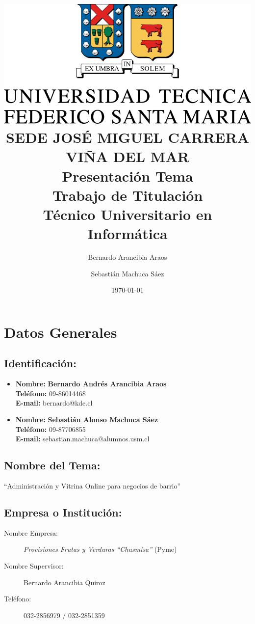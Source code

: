 \documentclass[a4paper,12pt]{article}
\title{\vspace*{4cm} \includegraphics[height=0.1\textheight]{utfsm.png}\\ \vspace*{0.2cm}
\tiny{SEDE JOSÉ MIGUEL CARRERA \\ VIÑA DEL MAR} \vspace*{2cm} \\ 
\Huge {Presentación Tema \\ Trabajo de Titulación} \\ \vspace*{0.5cm}
	 \Large{Técnico Universitario en Informática}}
\author{Bernardo Arancibia Araos
\and Sebastián Machuca Sáez}
\date{\today}
\begin{document}
\maketitle
\thispagestyle{empty} %
\newpage

\tableofcontents
\newpage

\section{Datos Generales}
\subsection{Identificación:}

  \begin{itemize}
   \item \textbf{Nombre:} \textbf{Bernardo Andrés Arancibia Araos} \\
         \textbf{Teléfono:} 09-86014468 \\ 
         \textbf{E-mail:} bernardo@kde.cl
  \end{itemize}
  \begin{itemize}
   \item \textbf{Nombre:} \textbf{Sebastián Alonso Machuca Sáez} \\
         \textbf{Teléfono:} 09-87706855 \\
         \textbf{E-mail:} sebastian.machuca@alumnos.usm.cl
  \end{itemize}

\subsection{Nombre del Tema:}
   ``Administración y Vitrina Online para negocios de barrio''

\subsection{Empresa o Institución:}
  \begin{description}
   \item [Nombre Empresa:] \emph{Provisiones Frutas y Verduras ``Chusmisa''} (Pyme)
   \item [Nombre Supervisor:] Bernardo Arancibia Quiroz
   \item [Teléfono:]{ 032-2856979 / 032-2851359}
  \end{description}
\end{document}
